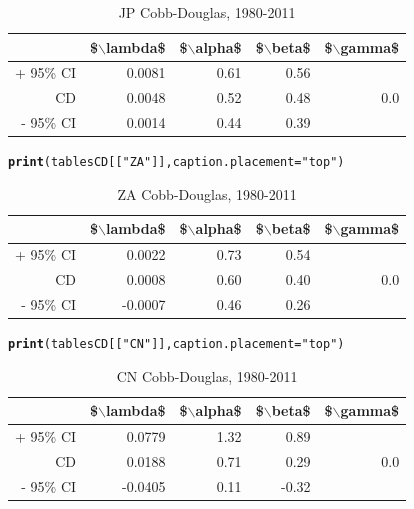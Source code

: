 \documentclass[preprint,authoryear,12pt]{elsarticle}\usepackage{graphicx, color}
\makeatletter
\newcommand{\hlfunctioncall}[1]{\textcolor[rgb]{0.501960784313725,0,0.329411764705882}{\textbf{#1}}}%
\newcommand{\hlstring}[1]{\textcolor[rgb]{0.6,0.6,1}{#1}}%
\newenvironment{kframe}{%
 \def\at@end@of@kframe{}%
 \ifinner\ifhmode%
  \def\at@end@of@kframe{\end{minipage}}%
  \begin{minipage}{\columnwidth}%
 \fi\fi%
 \def\FrameCommand##1{\hskip\@totalleftmargin \hskip-\fboxsep
 \colorbox{shadecolor}{##1}\hskip-\fboxsep
     \hskip-\linewidth \hskip-\@totalleftmargin \hskip\columnwidth}%
 \MakeFramed {\advance\hsize-\width
   \@totalleftmargin\z@ \linewidth\hsize
   \@setminipage}}%
 {\par\unskip\endMakeFramed%
 \at@end@of@kframe}
\makeatother
\begin{document}
\begin{table}[ht]
\begin{center}
\caption{JP Cobb-Douglas, 1980-2011}
\begin{tabular}{rrrrr}
  \hline
 & \$$\backslash$lambda\$ & \$$\backslash$alpha\$ & \$$\backslash$beta\$ & \$$\backslash$gamma\$ \\ 
  \hline
+ 95\% CI & 0.0081 & 0.61 & 0.56 &  \\ 
  CD & 0.0048 & 0.52 & 0.48 & 0.0 \\ 
  - 95\% CI & 0.0014 & 0.44 & 0.39 &  \\ 
   \hline
\end{tabular}
\end{center}
\end{table}
\begin{kframe}\begin{alltt}
\hlfunctioncall{print}(tablesCD[[\hlstring{"ZA"}]], caption.placement=\hlstring{"top"})
\end{alltt}
\end{kframe}%
\begin{table}[ht]
\begin{center}
\caption{ZA Cobb-Douglas, 1980-2011}
\begin{tabular}{rrrrr}
  \hline
 & \$$\backslash$lambda\$ & \$$\backslash$alpha\$ & \$$\backslash$beta\$ & \$$\backslash$gamma\$ \\ 
  \hline
+ 95\% CI & 0.0022 & 0.73 & 0.54 &  \\ 
  CD & 0.0008 & 0.60 & 0.40 & 0.0 \\ 
  - 95\% CI & -0.0007 & 0.46 & 0.26 &  \\ 
   \hline
\end{tabular}
\end{center}
\end{table}
\begin{kframe}\begin{alltt}
\hlfunctioncall{print}(tablesCD[[\hlstring{"CN"}]], caption.placement=\hlstring{"top"})
\end{alltt}
\end{kframe}%
\begin{table}[ht]
\begin{center}
\caption{CN Cobb-Douglas, 1980-2011}
\begin{tabular}{rrrrr}
  \hline
 & \$$\backslash$lambda\$ & \$$\backslash$alpha\$ & \$$\backslash$beta\$ & \$$\backslash$gamma\$ \\ 
  \hline
+ 95\% CI & 0.0779 & 1.32 & 0.89 &  \\ 
  CD & 0.0188 & 0.71 & 0.29 & 0.0 \\ 
  - 95\% CI & -0.0405 & 0.11 & -0.32 &  \\ 
   \hline
\end{tabular}
\end{center}
\end{table}
\end{document}
